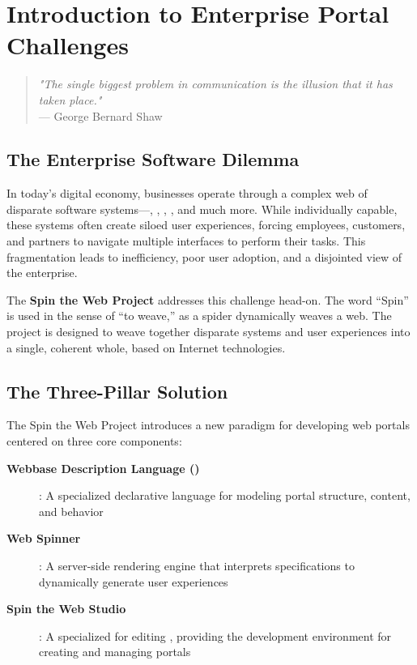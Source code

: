 
\chapter{Introduction to Enterprise Portal Challenges}
\label{chap:intro}

\begin{quote}
\textit{"The single biggest problem in communication is the illusion that it has taken place."} \\
— George Bernard Shaw
\end{quote}

\section{The Enterprise Software Dilemma}
\label{sec:enterprise-dilemma}

In today's digital economy, businesses operate through a complex web of disparate software systems—, , , , and much more. While individually capable, these systems often create siloed user experiences, forcing employees, customers, and partners to navigate multiple interfaces to perform their tasks. This fragmentation leads to inefficiency, poor user adoption, and a disjointed view of the enterprise.

The \textbf{Spin the Web Project} addresses this challenge head-on. The word ``Spin'' is used in the sense of ``to weave,'' as a spider dynamically weaves a web. The project is designed to weave together disparate systems and user experiences into a single, coherent whole, based on Internet technologies.

\section{The Three-Pillar Solution}
\label{sec:three-pillars}

The Spin the Web Project introduces a new paradigm for developing web portals centered on three core components:

\begin{description}
\item[\textbf{Webbase Description Language (\wbdl{})}]: A specialized declarative language for modeling portal structure, content, and behavior
\item[\textbf{Web Spinner}]: A server-side rendering engine that interprets \wbdl{} specifications to dynamically generate user experiences  
\item[\textbf{Spin the Web Studio}]: A specialized \webbaselet{} for editing , providing the development environment for creating and managing portals
\end{description}


